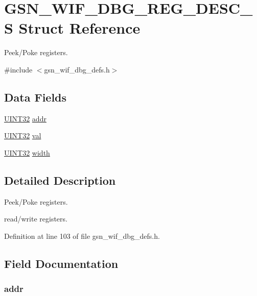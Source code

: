 \hypertarget{a00333}{
\section{GSN\_\-WIF\_\-DBG\_\-REG\_\-DESC\_\-S Struct Reference}
\label{a00333}
}


Peek/Poke registers.  




{\ttfamily \#include $<$gsn\_\-wif\_\-dbg\_\-defs.h$>$}

\subsection*{Data Fields}
\begin{DoxyCompactItemize}
\item 
\hyperlink{a00660_gae1e6edbbc26d6fbc71a90190d0266018}{UINT32} \hyperlink{a00333_a211571ed47a0fee2d898236395234dab}{addr}
\item 
\hyperlink{a00660_gae1e6edbbc26d6fbc71a90190d0266018}{UINT32} \hyperlink{a00333_a54d851e570e606ab36dbbae21f7f0095}{val}
\item 
\hyperlink{a00660_gae1e6edbbc26d6fbc71a90190d0266018}{UINT32} \hyperlink{a00333_a3c22ff514988933119b1154530e70d02}{width}
\end{DoxyCompactItemize}


\subsection{Detailed Description}
Peek/Poke registers. 

read/write registers. 

Definition at line 103 of file gsn\_\-wif\_\-dbg\_\-defs.h.



\subsection{Field Documentation}
\hypertarget{a00333_a211571ed47a0fee2d898236395234dab}{
\subsubsection[{addr}]{ {\bf addr}}}
\label{a00333_a211571ed47a0fee2d898236395234dab}


